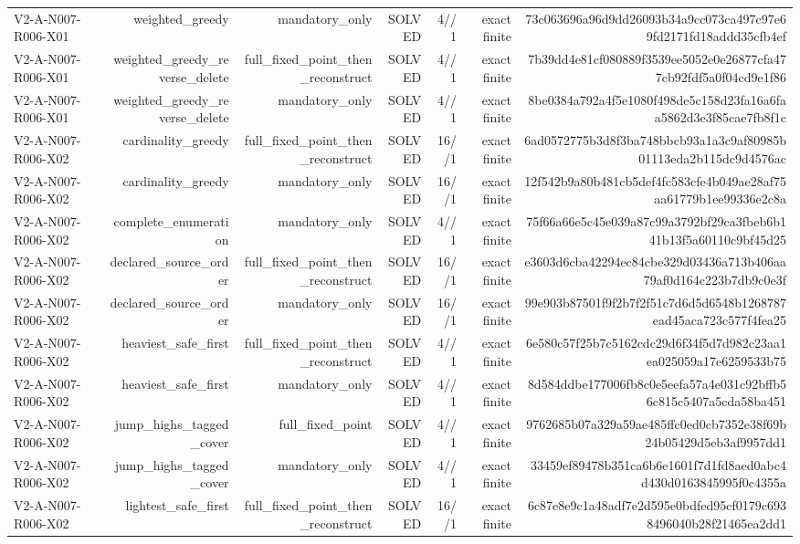 {\begin{longtable}{lrrrrrr}
V2-A-N007-R006-X01 & weighted\_greedy & mandatory\_only & SOLVED & 4//1 & exact finite & 73c063696a96d9dd26093b34a9cc073ca497c97e69fd2171fd18addd35cfb4ef \\
V2-A-N007-R006-X01 & weighted\_greedy\_reverse\_delete & full\_fixed\_point\_then\_reconstruct & SOLVED & 4//1 & exact finite & 7b39dd4e81cf080889f3539ee5052e0e26877cfa477cb92fdf5a0f04cd9e1f86 \\
V2-A-N007-R006-X01 & weighted\_greedy\_reverse\_delete & mandatory\_only & SOLVED & 4//1 & exact finite & 8be0384a792a4f5e1080f498de5c158d23fa16a6faa5862d3e3f85cae7fb8f1c \\
V2-A-N007-R006-X02 & cardinality\_greedy & full\_fixed\_point\_then\_reconstruct & SOLVED & 16//1 & exact finite & 6ad0572775b3d8f3ba748bbcb93a1a3c9af80985b01113eda2b115dc9d4576ac \\
V2-A-N007-R006-X02 & cardinality\_greedy & mandatory\_only & SOLVED & 16//1 & exact finite & 12f542b9a80b481cb5def4fc583cfe4b049ae28af75aa61779b1ee99336e2c8a \\
V2-A-N007-R006-X02 & complete\_enumeration & mandatory\_only & SOLVED & 4//1 & exact finite & 75f66a66e5c45e039a87c99a3792bf29ca3fbeb6b141b13f5a60110c9bf45d25 \\
V2-A-N007-R006-X02 & declared\_source\_order & full\_fixed\_point\_then\_reconstruct & SOLVED & 16//1 & exact finite & e3603d6cba42294ec84cbe329d03436a713b406aa79af0d164c223b7db9c0e3f \\
V2-A-N007-R006-X02 & declared\_source\_order & mandatory\_only & SOLVED & 16//1 & exact finite & 99e903b87501f9f2b7f2f51c7d6d5d6548b1268787ead45aca723c577f4fea25 \\
V2-A-N007-R006-X02 & heaviest\_safe\_first & full\_fixed\_point\_then\_reconstruct & SOLVED & 4//1 & exact finite & 6e580c57f25b7c5162cdc29d6f34f5d7d982c23aa1ea025059a17e6259533b75 \\
V2-A-N007-R006-X02 & heaviest\_safe\_first & mandatory\_only & SOLVED & 4//1 & exact finite & 8d584ddbe177006fb8c0e5eefa57a4e031c92bffb56c815c5407a5cda58ba451 \\
V2-A-N007-R006-X02 & jump\_highs\_tagged\_cover & full\_fixed\_point & SOLVED & 4//1 & exact finite & 9762685b07a329a59ae485ffc0ed0cb7352e38f69b24b05429d5eb3af9957dd1 \\
V2-A-N007-R006-X02 & jump\_highs\_tagged\_cover & mandatory\_only & SOLVED & 4//1 & exact finite & 33459ef89478b351ca6b6e1601f7d1fd8aed0abc4d430d0163845995f0c4355a \\
V2-A-N007-R006-X02 & lightest\_safe\_first & full\_fixed\_point\_then\_reconstruct & SOLVED & 16//1 & exact finite & 6c87e8e9c1a48adf7e2d595e0bdfed95cf0179c6938496040b28f21465ea2dd1 \\

\end{longtable}}
